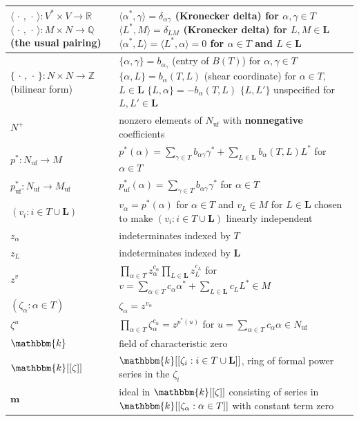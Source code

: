 \documentclass{amsart}
\theoremstyle{definition}
\theoremstyle{remark}
\numberwithin{equation}{section}
\newcommand{\integers}{\mathbb Z}
\newcommand{\rationals}{\mathbb Q}
\newcommand{\reals}{\mathbb R}
\newcommand{\uf}{{\operatorname{uf}}}
\newcommand{\set}[1]{{\lbrace #1 \rbrace}}
\newcommand{\br}[1]{{\langle #1 \rangle}}
\newcommand{\0}{{\mathbf{0}}}
\newcommand{\m}{\mathbf{m}}
\renewcommand{\k}{\mathbbm{k}}
\renewcommand{\L}{\mathbf{L}}
\begin{document}
\begin{longtable}{P{88.5pt}|P{248pt}}
\\\hline
$\br{\,\cdot\,,\,\cdot\,}:V^*\times V\to\reals$\linebreak
$\br{\,\cdot\,,\,\cdot\,}:M\times N\to\rationals$\linebreak
(the usual pairing)& 
$\br{\alpha^*,\gamma}=\delta_{\alpha\gamma}$ (Kronecker delta) for $\alpha,\gamma\in T$\linebreak
$\br{L^*,M}=\delta_{LM}$ (Kronecker delta) for $L,M\in\L$\linebreak
$\br{\alpha^*,L}=\br{L^*,\alpha}=0$ for $\alpha\in T$ and $L\in\L$
\\\hline
$\set{\,\cdot\,,\,\cdot\,}:N\times N\to\integers$\linebreak
(bilinear form)&$\set{\alpha,\gamma}=b_{\alpha_\gamma}$ (entry of $B(T)$) for $\alpha,\gamma\in T$\linebreak
$\set{\alpha,L}=b_\alpha(T,L)$ (shear coordinate) for $\alpha\in T$, $L\in\L$\linebreak
$\set{L,\alpha}=-b_\alpha(T,L)$\linebreak
$\set{L,L'}$ unspecified for $L,L'\in\L$
\\\hline
$N^+$& nonzero elements of $N_\uf$ with \textbf{nonnegative} coefficients\\\hline
$p^*:N_\uf\to M$&
$p^*(\alpha)=\sum_{\gamma\in T}b_{\alpha\gamma}\gamma^*+\sum_{L\in\L}b_\alpha(T,L)L^*$ for $\alpha\in T$\\\hline
$p^*_\uf:N_\uf\to M_\uf$&
$p^*_\uf(\alpha)=\sum_{\gamma\in T}b_{\alpha\gamma}\gamma^*$ for $\alpha\in T$\\\hline
$(v_i:i\in T\cup\L)$&$v_\alpha=p^*(\alpha)$ for $\alpha\in T$ and
$v_L\in M$ for $L\in\L$ chosen to make $(v_i:i\in T\cup\L)$ linearly independent
\\\hline
$z_\alpha$&indeterminates indexed by $T$\\\hline
$z_L$&indeterminates indexed by $\L$\\\hline
$z^v$&$\displaystyle\prod_{\alpha\in T}z_\alpha^{c_\alpha}\prod_{L\in\L}z_L^{c_L}$ for $\displaystyle v=\sum_{\alpha\in T}c_\alpha\alpha^*+\sum_{L\in\L}c_LL^*\in M$\\\hline
$(\zeta_\alpha:\alpha\in T)$&$\zeta_\alpha=z^{v_\alpha}$\\\hline
$\zeta^u$&$\displaystyle\prod_{\alpha\in T}\zeta_\alpha^{c_\alpha}=z^{p^*(u)}$ for $\displaystyle u=\sum_{\alpha\in T}c_\alpha\alpha\in N_\uf$\\\hline
$\k$&field of characteristic zero\\\hline
$\k[[\zeta]]$&$\k[[\zeta_i:i\in T\cup\L]]$, ring of formal power series in the $\zeta_i$ \\\hline
$\m$&ideal in $\k[[\zeta]]$ consisting of series in $\k[[\zeta_\alpha:\alpha\in T]]$ with constant term zero\\\hline
\end{longtable}
\end{document}
